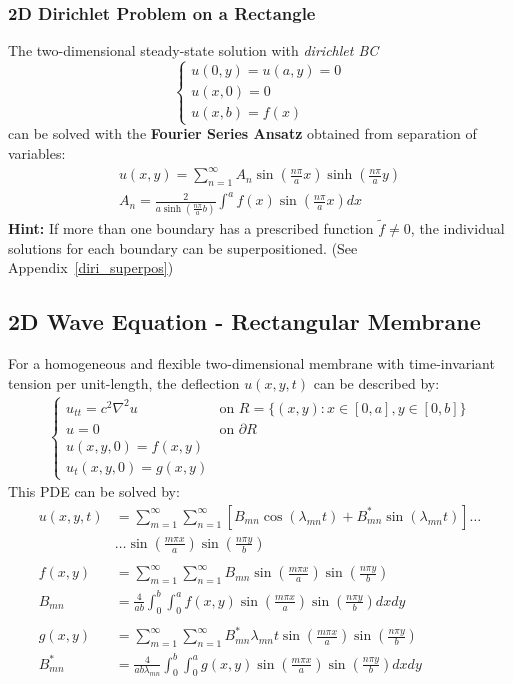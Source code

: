 \subsubsection{2D Dirichlet Problem on a Rectangle}
The two-dimensional steady-state solution with \textit{dirichlet BC}
\begin{equation*}
    \begin{cases}
        u(0,y)=u(a,y)=0 \\
        u(x,0)=0        \\
        u(x,b)=f(x)
    \end{cases}
\end{equation*}
can be solved with the \textbf{Fourier Series Ansatz} obtained from separation of variables:
\begin{align*}
    u(x,y)=\sum_{n=1}^{\infty}A_{n}\sin(\frac{n\pi}ax)\sinh(\frac{n\pi}ay) \\
    A_{n}=\frac{2}{a\sinh(\frac{n\pi}{a}b)}\int^{a}f(x)\sin(\frac{n\pi}{a}x)dx
\end{align*}
\textbf{Hint:} If more than one boundary has a prescribed function $\widetilde{f}\neq0$, the
individual solutions for each boundary can be superpositioned. (See Appendix~\ref*{diri_superpos})

\subsection{2D Wave Equation - Rectangular Membrane}
For a homogeneous and flexible two-dimensional membrane with time-invariant tension per unit-length,
the deflection $u(x,y,t)$ can be described by:
\begin{align*}
    \begin{cases}
        u_{tt}=c^2\nabla^2u & \text{on }R=\{(x,y):x\in[0,a],y\in[0,b]\} \\
        u=0                 & \text{on }\partial R                              \\
        u(x,y,0)=f(x,y)                                                         \\
        u_t(x,y,0)=g(x,y)
    \end{cases}
\end{align*}
This PDE can be solved by:
\begin{align*}
    u(x,y,t)&=\sum_{m=1}^{\infty}\sum_{n=1}^{\infty}\left[B_{mn}\cos(\lambda_{mn}t)+B_{mn}^{*}\sin(\lambda_{mn}t)\right]\dots
    \\&\dots \sin\left(\frac{m\pi x}{a}\right)\sin\left(\frac{n\pi y}{b}\right)\\\\
    f(x,y)&=\sum_{m=1}^{\infty}\sum_{n=1}^{\infty}B_{mn}\sin\left(\frac{m\pi x}a\right)\sin\left(\frac{n\pi y}b\right)\\
    B_{mn}&= \frac4{ab}\int_0^b\int_0^{a}f(x,y)\sin\left(\frac{m\pi x}a\right)\sin\left(\frac{n\pi y}b\right)dxdy\\\\
    g(x,y)&=\sum_{m=1}^\infty\sum_{n=1}^\infty B_{mn}^*\lambda_{mn}t\sin\left(\frac{m\pi x}a\right)\sin\left(\frac{n\pi y}b\right)\\
    B_{mn}^{*}&=\frac4{ab\lambda_{mn}}\int_{0}^{b}\int_{0}^{a}g(x,y)\sin\left(\frac{m\pi x}a\right)\sin\left(\frac{n\pi y}b\right)dxdy
\end{align*}